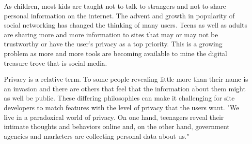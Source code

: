 As children, most kids are taught not to talk to strangers and not to share
personal information on the internet. The advent and growth in popularity of
social networking has changed the thinking of many users. Teens as well as
adults are sharing more and more information to sites that may or may not be
trustworthy or have the user's privacy as a top priority. This is a growing
problem as more and more tools are becoming available to mine the digital
treasure trove that is social media.

Privacy is a relative term. To some people revealing little more than their
name is an invasion and there are others that feel that the information about
them might as well be public. These differing philosophies can make it
challenging for site developers to match features with the level of privacy that
the users want. "We live in a paradoxical world of privacy. On one hand,
teenagers reveal their intimate thoughts and behaviors online and, on the other
hand, government agencies and marketers are collecting personal data about
us."~\cite{barnes2006privacy}
